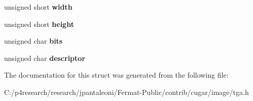 \begin{DoxyCompactItemize}
unsigned short {\bfseries width}
\item 
\mbox{\label{structcugar_1_1_t_g_a_header_ab74e08b02f9ac5aedd5d84ddb8e9cade}} 
unsigned short {\bfseries height}
\item 
\mbox{\label{structcugar_1_1_t_g_a_header_a9f25afe53cb2d8757855015bc6bd493b}} 
unsigned char {\bfseries bits}
\item 
\mbox{\label{structcugar_1_1_t_g_a_header_ac1656092e479d04dd74fe6b16dc71f5b}} 
unsigned char {\bfseries descriptor}
\end{DoxyCompactItemize}


The documentation for this struct was generated from the following file\+:\begin{DoxyCompactItemize}
\item 
C\+:/p4research/research/jpantaleoni/\+Fermat-\/\+Public/contrib/cugar/image/tga.\+h\end{DoxyCompactItemize}
